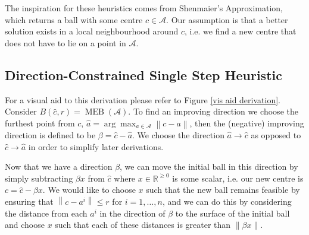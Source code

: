 \documentclass[11pt,twoside]{report}
\newcommand{\A}{\mathcal{A}} %
\newcommand{\norm}[1]{\left\lVert#1\right\rVert}
\DeclareMathOperator{\MEB}{MEB}
\theoremstyle{definition}
\numberwithin{theorem}{section}
\numberwithin{definition}{section}
\numberwithin{lemma}{section}
\numberwithin{proposition}{section}
\numberwithin{equation}{section}
\numberwithin{figure}{section}
\begin{document}
The inspiration for these heuristics comes from Shenmaier's Approximation, which returns a ball with some centre $c\in\A$. Our assumption is that a better solution exists in a local neighbourhood around $c$, i.e. we find a new centre that does not have to lie on a point in $\A$.
\subsection{Direction-Constrained Single Step Heuristic}
For a visual aid to this derivation please refer to Figure \ref{vis aid derivation}. Consider $B(\hat{c}, r) = \MEB(\A)$. To find an improving direction we choose the furthest point from $c$, $\hat{a}=\arg\max_{a\in\A}\norm{c-a}$, then the (negative) improving direction is defined to be $\beta=\hat{c}-\hat{a}$. We choose the direction $\hat{a}\to\hat{c}$ as opposed to $\hat{c}\to\hat{a}$ in order to simplify later derivations.

Now that we have a direction $\beta$, we can move the initial ball in this direction by simply subtracting $\beta x$ from $\hat{c}$ where $x\in\mathbb{R}^{\geq0}$ is some scalar, i.e. our new centre is $c=\hat{c}-\beta x$. We would like to choose $x$ such that the new ball remains feasible by ensuring that $\norm{c-a^i}\leq r$ for $i=1,\ldots,n$, and we can do this by considering the distance from each $a^i$ in the direction of $\beta$ to the surface of the initial ball and choose $x$ such that each of these distances is greater than $\norm{\beta x}$.
\end{document}
